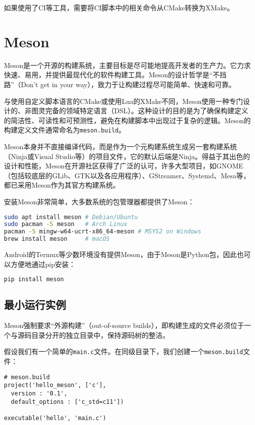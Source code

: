 \documentclass[../main.tex]{subfiles}
\begin{document}
如果使用了CI等工具，需要将CI脚本中的相关命令从CMake转换为XMake。

\section{Meson}

Meson是一个开源的构建系统，主要目标是尽可能地提高开发者的生产力。它力求快速、易用，并提供最现代化的软件构建工具。Meson的设计哲学是“不挡路”（Don't get in your way），致力于让构建过程尽可能简单、快速和可靠。

与使用自定义脚本语言的CMake或使用Lua的XMake不同，Meson使用一种专门设计的、非图灵完备的领域特定语言（DSL）。这种设计的目的是为了确保构建定义的简洁性、可读性和可预测性，避免在构建脚本中出现过于复杂的逻辑。Meson的构建定义文件通常命名为\texttt{meson.build}。

Meson本身并不直接编译代码，而是作为一个元构建系统生成另一套构建系统（Ninja或Visual Studio等）的项目文件，它的默认后端是Ninja。得益于其出色的设计和性能，Meson在开源社区获得了广泛的认可，许多大型项目，如GNOME（包括较底层的GLib、GTK以及各应用程序）、GStreamer、Systemd、Mesa等，都已采用Meson作为其官方构建系统。

安装Meson非常简单，大多数系统的包管理器都提供了Meson：
\begin{lstlisting}[language=bash]
sudo apt install meson # Debian/Ubuntu
sudo pacman -S meson   # Arch Linux
pacman -S mingw-w64-ucrt-x86_64-meson # MSYS2 on Windows
brew install meson     # macOS
\end{lstlisting}

Android的Termux等少数环境没有提供Meson，由于Meson是Python包，因此也可以方便地通过pip安装：
\begin{lstlisting}[language=bash]
pip install meson
\end{lstlisting}

\subsection{最小运行实例}
Meson强制要求“外源构建”（out-of-source builds），即构建生成的文件必须位于一个与源码目录分开的独立目录中，保持源码树的整洁。

假设我们有一个简单的\texttt{main.c}文件。在同级目录下，我们创建一个\texttt{meson.build}文件：
\begin{lstlisting}
# meson.build
project('hello_meson', ['c'],
  version : '0.1',
  default_options : ['c_std=c11'])

executable('hello', 'main.c')
\end{lstlisting}
\end{document}
